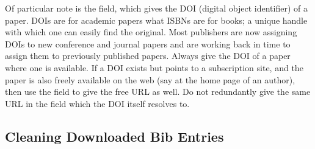 Of particular note is the  field, which gives the DOI
(digital object identifier) of a paper. DOIs are for academic papers
what ISBNs are for books; a unique handle with which one can easily
find the original. Most publishers are now assigning DOIs to new
conference and journal papers and are working back in time to assign
them to previously published papers. Always give the DOI of a paper
where one is available. If a DOI exists but points to a subscription
site, and the paper is also freely available on the web (say at the
home page of an author), then use the  field to give the
free URL as well. Do not redundantly give the same URL in the
 field which the DOI itself resolves to.





\subsection{Cleaning Downloaded Bib Entries}

